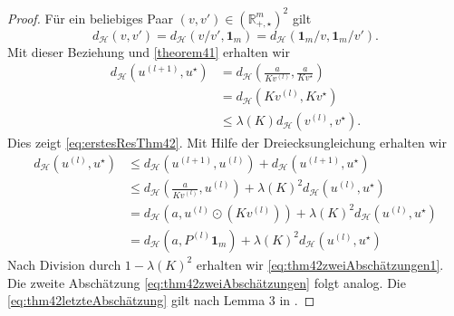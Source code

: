 \documentclass[twoside, 12pt,a4paper]{book}
\newtheorem{remark}[theorem]{Bemerkung}
\numberwithin{equation}{section}
\begin{document}
	\begin{proof}
		Für ein beliebiges Paar $(v,v') \in (\mathbb{R}_{+,\star}^m)^2$ gilt
		\begin{equation*}
		d_\mathcal{H} (v,v') = d_\mathcal{H}(v/v',\boldsymbol{1}_m) = d_\mathcal{H}(\boldsymbol{1}_m/v,\boldsymbol{1}_m/v').
		\end{equation*}
		Mit dieser Beziehung und \autoref{theorem41} erhalten wir
		\begin{align*}
		d_\mathcal{H}(u^{(l+1)}, u^\star) &= d_\mathcal{H}\left(\frac{a}{Kv^{(l)}},\frac{a}{Kv^\star}\right)\\
		&=d_\mathcal{H}(Kv^{(l)}, Kv^\star) \\
		&\leq \lambda (K)d_\mathcal{H}(v^{(l)},v^\star).
		\end{align*}
		Dies zeigt \eqref{eq:erstesResThm42}. Mit Hilfe der Dreiecksungleichung erhalten wir
		\begin{align*}
		d_\mathcal{H}(u^{(l)}, u^\star) &\leq d_\mathcal{H}(u^{(l+1)},u^{(l)}) + d_\mathcal{H}(u^{(l+1)},u^\star)\\
		& \leq d_\mathcal{H}\left(\frac{a}{Kv^{(l)}}, u^{(l)}\right) + \lambda (K)^2 d_\mathcal{H}(u^{(l)},u^\star)\\
		&= d_\mathcal{H}\left(a, u^{(l)} \odot (Kv^{(l)})\right) + \lambda (K)^2 d_\mathcal{H}(u^{(l)},u^\star)\\
		&= d_\mathcal{H}\left(a, P^{(l)}\boldsymbol{1}_m \right) + \lambda (K)^2 d_\mathcal{H}(u^{(l)},u^\star)
		\end{align*}
		Nach Division durch $1-\lambda(K)^2$ erhalten wir  \autoref{eq:thm42zweiAbschätzungen1}. Die zweite Abschätzung
		\eqref{eq:thm42zweiAbschätzungen} folgt analog. 
		Die \autoref{eq:thm42letzteAbschätzung} gilt nach Lemma 3 in \cite{franklin_sinkhorn_convergence}.
	\end{proof}
	

\end{document}
